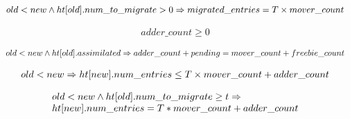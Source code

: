 \begin{lemma}
    \begin{equation*}
\begin{array}{l}      
  old < new \wedge \mbox{$ht[old]$}.num\_to\_migrate > 0 \Rightarrow migrated\_entries = T \times mover\_count
\end{array}
    \end{equation*}  
    \label{revenue3}    
\end{lemma}

\begin{lemma}
    \begin{equation*}
\begin{array}{l}      
  adder\_count \geq 0
\end{array}
    \end{equation*}  
    \label{posted0}  
\end{lemma}

\begin{lemma}
  \begin{equation*}
    \begin{array}{l}      
      old < new \wedge \mbox{$ht[old]$}.assimilated \Rightarrow adder\_count+ pending = mover\_count + freebie\_count
    \end{array}
  \end{equation*}    
  \label{posted1}
\end{lemma}

\begin{lemma}
  \begin{equation*}
    \begin{array}{l}      
      old < new \Rightarrow \mbox{$ht[new]$}.num\_entries \leq T \times mover\_count + adder\_count
    \end{array}
  \end{equation*}  
  \label{upper_strengthening1}
\end{lemma}

\begin{lemma}
\begin{equation*}
\begin{array}{l}  
  old < new \wedge \mbox{$ht[old]$}.num\_to\_migrate \geq t \Rightarrow
  \\ \mbox{$ht[new]$}.num\_entries = T * mover\_count + adder\_count
\end{array}
\end{equation*}
\label{upper_strengthening2}  
\end{lemma}

